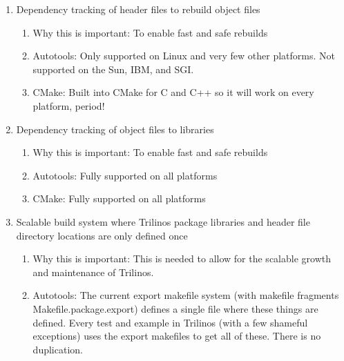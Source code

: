 \documentclass[pdf,ps2pdf,11pt]{SANDreport}
\begin{document}
\begin{enumerate}

{}\item Dependency tracking of header files to rebuild object files

  \begin{enumerate}

  {}\item Why this is important: To enable fast and safe rebuilds

  {}\item Autotools: Only supported on Linux and very few other
  platforms.  Not supported on the Sun, IBM, and SGI.

  {}\item CMake: Built into CMake for C and C++ so it will work on
  every platform, period!

  \end{enumerate}

{}\item Dependency tracking of object files to libraries

  \begin{enumerate}

  {}\item Why this is important: To enable fast and safe rebuilds

  {}\item Autotools: Fully supported on all platforms

  {}\item CMake: Fully supported on all platforms

  \end{enumerate}

{}\item Scalable build system where Trilinos package libraries and
header file directory locations are only defined once

  \begin{enumerate}

  {}\item Why this is important: This is needed to allow for the
  scalable growth and maintenance of Trilinos.

  {}\item Autotools: The current export makefile system (with makefile
  fragments Makefile.package.export) defines a single file where these
  things are defined.  Every test and example in Trilinos (with a few
  shameful exceptions) uses the export makefiles to get all of these.
  There is no duplication.


\end{enumerate}
\end{enumerate}
\end{document}
